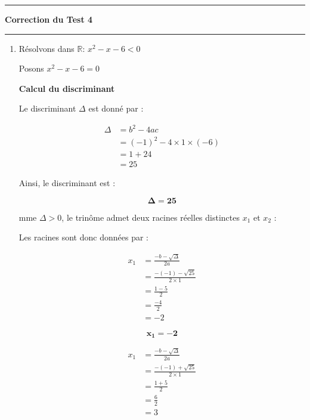 \documentclass[a4paper,12pt]{article}
\begin{document}
\hrule %
\begin{center}
    {\Large \textbf{Correction du Test 4}}
\end{center}
\hrule

\begin{enumerate}
    \item Résolvons dans \(\mathbb{R}\): \( x^2 - x - 6 < 0\)

Posons \( x^2 - x - 6 = 0\)

\textbf{Calcul du discriminant} 
 
Le discriminant \(\Delta\) est donné par :

\[
\begin{aligned}
 \Delta &= b^2 - 4ac \\
        &= (-1)^2 - 4 \times 1 \times (-6) \\
        &= 1 + 24 \\
        &= 25
\end{aligned}
\]

Ainsi, le discriminant est : 

\begin{resultbox}
    \[
    \mathbf{\Delta = 25}
    \]
\end{resultbox}

mme \(\Delta > 0\), le trinôme admet deux racines réelles distinctes \( x_1 \) et \( x_2 \) :

Les racines sont donc données par :

\[
\begin{aligned}
        x_1 &= \frac{-b - \sqrt{\Delta}}{2a} \\
            &= \frac{-(-1) - \sqrt{25}}{2 \times 1} \\
            &= \frac{1 - 5}{2} \\
            &= \frac{-4}{2} \\
            &= -2
\end{aligned}
\]

\begin{resultbox}
    \[
    \mathbf{x_1 = -2}
    \]
\end{resultbox}

\[
\begin{aligned}
        x_1 &= \frac{-b - \sqrt{\Delta}}{2a} \\
            &= \frac{-(-1) + \sqrt{25}}{2 \times 1} \\
            &= \frac{1 + 5}{2} \\
            &= \frac{6}{2} \\
            &= 3
\end{aligned}
\]


\end{enumerate}
\end{document}
